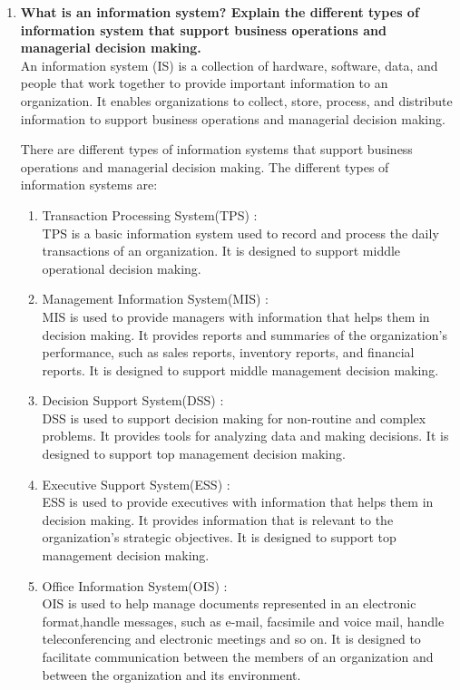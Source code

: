 \documentclass[12pt]{article}
\begin{document}
\begin{enumerate}
    \item {\bfseries What is an information system? Explain the different types of information system that support business operations and managerial decision making. \\}
    An information system (IS) is a collection of hardware, software, data, and people that work together to provide important information to an organization. 
    It enables organizations to collect, store, process, and distribute information to support business operations and managerial decision making. 
    
    There are different types of information systems that support business operations and managerial decision making. 
    The different types of information systems are:
    \begin{enumerate}
        \item Transaction Processing System(TPS) : \\
        TPS is a basic information system used to record and process the daily transactions of an organization. It is designed to support middle operational decision making.
        \item Management Information System(MIS) :\\
        MIS is used to provide managers with information that helps them in decision making. It provides reports and summaries of the organization's performance, such as sales reports, inventory reports, and financial reports. It is designed to support middle management decision making.
        \item Decision Support System(DSS) :\\
        DSS is used to support decision making for non-routine and complex problems. It provides tools for analyzing data and making decisions. It is designed to support top management decision making.
        \item Executive Support System(ESS) :\\
        ESS is used to provide executives with information that helps them in decision making. It provides information that is relevant to the organization's strategic objectives. It is designed to support top management decision making.
        \item Office Information System(OIS) :\\
        OIS is used  to help manage documents represented in an electronic format,handle messages, such as e-mail, facsimile and voice mail, handle teleconferencing and electronic meetings and so on. It is designed to facilitate communication between the members of an organization and between the organization and its environment.
    \end{enumerate}


\end{enumerate}
\end{document}
